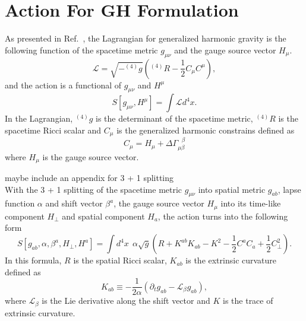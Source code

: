 \documentclass[letterpaper,nofootinbib,prd,amsmath,onecolumn]{revtex4-1}
\begin{document}
\section{Action For GH Formulation}\label{action}
As presented in Ref.~\cite{Brown:2010rya}, the Lagrangian for generalized harmonic gravity is the following function of the spacetime metric $g_{\mu\nu}$ and the gauge source vector $H_{\mu}$. 
\begin{equation}
\mathscr{L} = \sqrt{-^{(4)}g} \left(^{(4)}R - \frac{1}{2}C_{\mu}C^{\mu}\right), 
\end{equation}
and the action is a functional of $g_{\mu\nu}$ and $H^{\mu}$
\begin{equation}
S\left[g_{\mu\nu}, H^{\mu}\right] = \int \mathscr{L} d^{4}x.
\end{equation}
In the Lagrangian, $^{(4)}g$ is the determinant of the spacetime metric, $^{(4)}R$ is the spacetime Ricci scalar and $C_{\mu}$ is the generalized harmonic constrains defined as
\begin{equation}
C_{\mu} = H_{\mu} + \Delta \Gamma^{~~~\beta}_{\mu\beta}
\end{equation}
where $H_{\mu}$ is the gauge source vector. 

{\color{red} maybe include an appendix for 3 + 1 splitting }\\
With the 3 + 1 splitting of the spacetime metric $g_{\mu\nu}$ into spatial metric $g_{ab}$, lapse function $\alpha$ and shift vector $\beta^{a}$, the gauge source vector $H_{\mu}$ into its time-like component $H_{\perp}$ and spatial component $H_{a}$, the action turns into the following form
\begin{equation}\label{action}
S\left[g_{ab}, \alpha, \beta^{a}, H_{\perp}, H^{a}\right] = \int d^{4}x~~\alpha \sqrt{g} \left( R + K^{ab}K_{ab} - K^{2} - \frac{1}{2}C^{a}C_{a} + \frac{1}{2}C_{\perp}^{2}\right).
\end{equation}
In this formula, $R$ is the spatial Ricci scalar, $K_{ab}$ is the extrinsic curvature defined as
\begin{equation}
K_{ab} \equiv -\frac{1}{2\alpha}\left(\partial_{t}g_{ab} - \mathcal{L}_{\beta}g_{ab}\right),  
\end{equation}
where $\mathcal{L}_{\beta}$ is the Lie derivative along the shift vector and $K$ is the trace of extrinsic curvature. 
\end{document}
